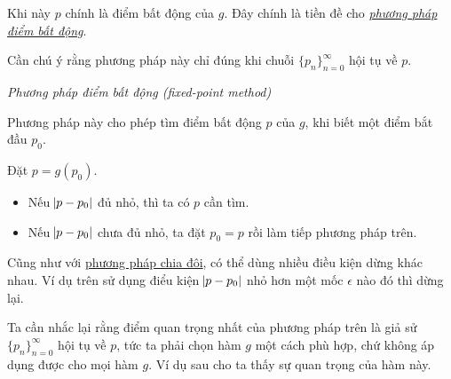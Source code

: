 \documentclass[../../Lectures]{subfiles}
\begin{document}
Khi này \(p\) chính là điểm bất động của \(g\). Đây chính là tiền đề cho
\hyperref[method:fixed_point]{\emph{phương pháp điểm bất động}}.

Cần chú ý rằng phương pháp này chỉ đúng khi chuỗi \(\{p_n\}_{n=0}^\infty\) hội
tụ về \(p\).

\begin{method}\label{method:fixed_point}
    \emph{Phương pháp điểm bất động (fixed-point method)}

    Phương pháp này cho phép tìm điểm bất động \(p\) của \(g\), khi biết một
    điểm bắt đầu \(p_0\).

    Đặt \(p = g(p_0)\).

    \begin{itemize}
        \item Nếu \(\abs{p - p_0}\) đủ nhỏ, thì ta có \(p\) cần tìm.
        \item Nếu \(\abs{p - p_0}\) chưa đủ nhỏ, ta đặt \(p_0 = p\) rồi làm tiếp
            phương pháp trên.
    \end{itemize}
\end{method}

Cũng như với \hyperref[method:bisection]{phương pháp chia đôi}, có thể dùng
nhiều điều kiện dừng khác nhau. Ví dụ trên sử dụng điểu kiện \(\abs{p - p_0}\)
nhỏ hơn một mốc \(\epsilon\) nào đó thì dừng lại.

Ta cần nhắc lại rằng điểm quan trọng nhất của phương pháp trên là giả sử
\(\{p_n\}_{n=0}^\infty\) hội tụ về \(p\), tức ta phải chọn hàm \(g\) một cách
phù hợp, chứ không áp dụng được cho mọi hàm \(g\). Ví dụ sau cho ta thấy sự quan
trọng của hàm này.
\end{document}
